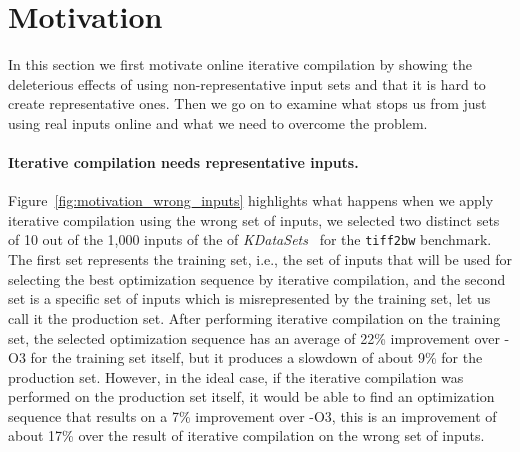 \section{Motivation \label{sec:motivation}}


    In this section we first motivate online iterative compilation by showing the deleterious effects of using non-representative input
    sets and that it is hard to create representative ones. Then we go on to examine what stops us from just using real inputs online and
    what we need to overcome the problem.

    \paragraph{Iterative compilation needs representative inputs.} 
    Figure~\ref{fig:motivation_wrong_inputs} highlights what happens when we apply iterative compilation using the wrong set of inputs, we selected two distinct sets of
    10 out of the 1,000 inputs of the of \textit{KDataSets}~\cite{chen10,chen12a} for the \texttt{tiff2bw} benchmark.
    The first set represents the training set, i.e., the set of inputs that will be used for selecting the best optimization sequence by
    iterative compilation, and the second set is a specific set of inputs which is misrepresented by the training set, let us call it the production set.
    After performing iterative compilation on the training set, the selected optimization sequence has an average of 22\% improvement over -O3 for
    the training set itself, but it produces a slowdown of about 9\% for the production set.
    However, in the ideal case, if the iterative compilation was performed on the production set itself, it would be able to find an optimization sequence that
    results on a 7\% improvement over -O3, this is an improvement of about 17\% over
    the result of iterative compilation on the wrong set of inputs.
    

